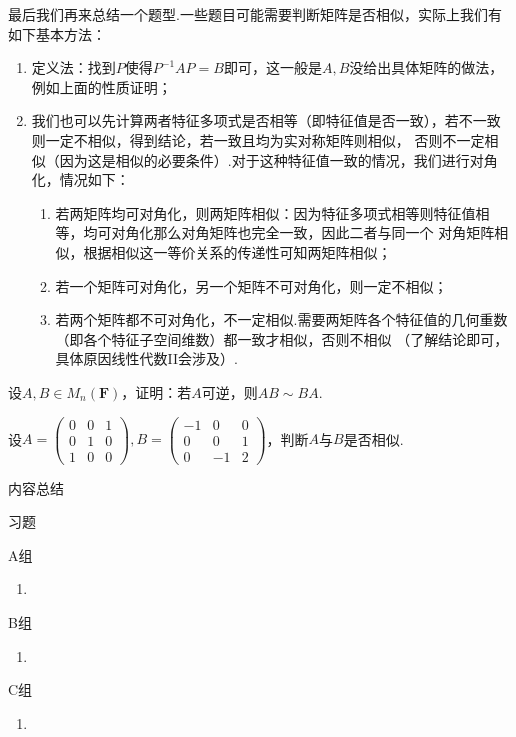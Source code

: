 最后我们再来总结一个题型.一些题目可能需要判断矩阵是否相似，实际上我们有如下基本方法：
\begin{enumerate}
    \item 定义法：找到$P$使得$P^{-1}AP=B$即可，这一般是$A,B$没给出具体矩阵的做法，例如上面的性质证明；
    \item 我们也可以先计算两者特征多项式是否相等（即特征值是否一致），若不一致则一定不相似，得到结论，若一致且均为实对称矩阵则相似，
    否则不一定相似（因为这是相似的必要条件）.对于这种特征值一致的情况，我们进行对角化，情况如下：
    \begin{enumerate}[label=(\arabic*)]
        \item 若两矩阵均可对角化，则两矩阵相似：因为特征多项式相等则特征值相等，均可对角化那么对角矩阵也完全一致，因此二者与同一个
        对角矩阵相似，根据相似这一等价关系的传递性可知两矩阵相似；
        \item 若一个矩阵可对角化，另一个矩阵不可对角化，则一定不相似；
        \item 若两个矩阵都不可对角化，不一定相似.需要两矩阵各个特征值的几何重数（即各个特征子空间维数）都一致才相似，否则不相似
        （了解结论即可，具体原因线性代数II会涉及）.
    \end{enumerate}
\end{enumerate}
\begin{example}
    设$A,B\in M_n(\mathbf{F})$，证明：若$A$可逆，则$AB\sim BA$.
\end{example}
\begin{example}
    设$A=\begin{pmatrix}
        0 & 0 & 1 \\ 0 & 1 & 0 \\ 1 & 0 & 0
    \end{pmatrix},B=\begin{pmatrix}
        -1 & 0 & 0 \\ 0 & 0 & 1 \\ 0 & -1 & 2
    \end{pmatrix}$，判断$A$与$B$是否相似.
\end{example}

\vspace{2ex}
\centerline{\heiti \Large 内容总结}

\vspace{2ex}

\centerline{\heiti \Large 习题}
\vspace{2ex}
{\kaishu }
\begin{flushright}
    \kaishu

\end{flushright}
\centerline{\heiti A组}
\begin{enumerate}
    \item
\end{enumerate}
\centerline{\heiti B组}
\begin{enumerate}
    \item
\end{enumerate}
\centerline{\heiti C组}
\begin{enumerate}
    \item
\end{enumerate}
